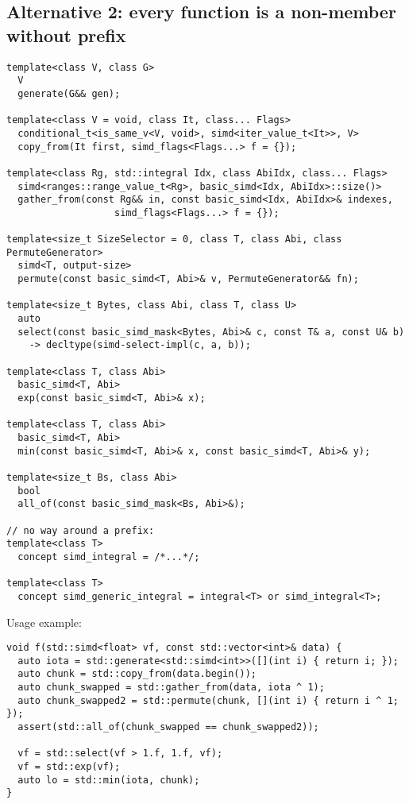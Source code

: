 \subsection{Alternative 2: every function is a non-member without  prefix}

\medskip\begin{lstlisting}[style=Vc]
template<class V, class G>
  V
  generate(G&& gen);

template<class V = void, class It, class... Flags>
  conditional_t<is_same_v<V, void>, simd<iter_value_t<It>>, V>
  copy_from(It first, simd_flags<Flags...> f = {});

template<class Rg, std::integral Idx, class AbiIdx, class... Flags>
  simd<ranges::range_value_t<Rg>, basic_simd<Idx, AbiIdx>::size()>
  gather_from(const Rg&& in, const basic_simd<Idx, AbiIdx>& indexes,
                   simd_flags<Flags...> f = {});

template<size_t SizeSelector = 0, class T, class Abi, class PermuteGenerator>
  simd<T, output-size>
  permute(const basic_simd<T, Abi>& v, PermuteGenerator&& fn);

template<size_t Bytes, class Abi, class T, class U>
  auto
  select(const basic_simd_mask<Bytes, Abi>& c, const T& a, const U& b)
    -> decltype(simd-select-impl(c, a, b));

template<class T, class Abi>
  basic_simd<T, Abi>
  exp(const basic_simd<T, Abi>& x);

template<class T, class Abi>
  basic_simd<T, Abi>
  min(const basic_simd<T, Abi>& x, const basic_simd<T, Abi>& y);

template<size_t Bs, class Abi>
  bool
  all_of(const basic_simd_mask<Bs, Abi>&);

// no way around a prefix:
template<class T>
  concept simd_integral = /*...*/;

template<class T>
  concept simd_generic_integral = integral<T> or simd_integral<T>;
\end{lstlisting}

Usage example:
\medskip\begin{lstlisting}[style=Vc]
void f(std::simd<float> vf, const std::vector<int>& data) {
  auto iota = std::generate<std::simd<int>>([](int i) { return i; });
  auto chunk = std::copy_from(data.begin());
  auto chunk_swapped = std::gather_from(data, iota ^ 1);
  auto chunk_swapped2 = std::permute(chunk, [](int i) { return i ^ 1; });
  assert(std::all_of(chunk_swapped == chunk_swapped2));

  vf = std::select(vf > 1.f, 1.f, vf);
  vf = std::exp(vf);
  auto lo = std::min(iota, chunk);
}
\end{lstlisting}

